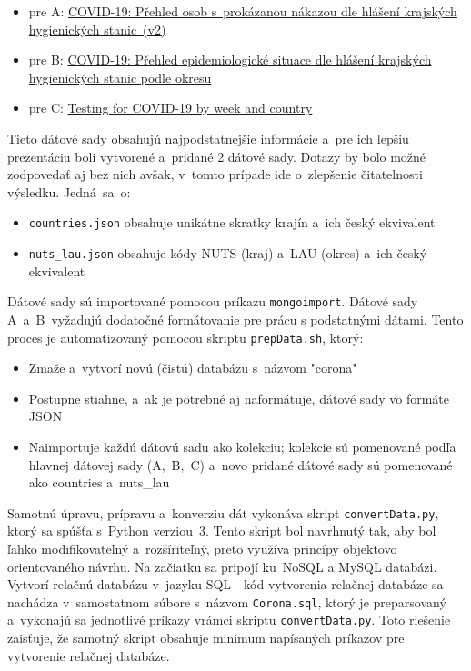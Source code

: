 \documentclass [11pt, a4paper]{article}
\begin{document}
\begin{itemize}
\item pre A: \href{https://onemocneni-aktualne.mzcr.cz/api/v2/covid-19/osoby.min.json }{COVID-19: Přehled osob s~prokázanou nákazou dle hlášení krajských hygienických stanic~(v2)}
\item pre B: \href{https://onemocneni-aktualne.mzcr.cz/api/v2/covid-19/kraj-okres-nakazeni-vyleceni-umrti.min.json}{COVID-19: Přehled epidemiologické situace dle hlášení krajských hygienických stanic podle okresu}
\item pre C: \href{https://www.ecdc.europa.eu/en/publications-data/covid-19-testing}{Testing for COVID-19 by week and country}
\end{itemize}

Tieto dátové sady obsahujú najpodstatnejšie informácie a~pre ich lepšiu prezentáciu boli vytvorené a~pridané 2 dátové sady. Dotazy by bolo možné zodpovedať aj bez nich avšak, v~tomto prípade ide o~zlepšenie čitatelnosti výsledku. Jedná~sa~o:
\begin{itemize}
\item \texttt{countries.json} obsahuje unikátne skratky krajín a~ich český ekvivalent
\item \texttt{nuts\_lau.json} obsahuje kódy NUTS (kraj) a~LAU (okres) a~ich český ekvivalent
\end{itemize} 

Dátové sady sú importované pomocou príkazu \texttt{mongoimport}. Dátové sady A~a~B~vyžadujú dodatočné formátovanie pre prácu s podstatnými dátami. Tento proces je automatizovaný pomocou skriptu \texttt{prepData.sh}, ktorý:
\begin{itemize}
\item Zmaže a~vytvorí novú (čistú) databázu s~názvom "corona"
\item Postupne stiahne, a~ak je potrebné aj naformátuje, dátové sady vo formáte JSON
\item Naimportuje každú dátovú sadu ako kolekciu; kolekcie sú pomenované podľa hlavnej dátovej sady (A,~B,~C) a~novo pridané dátové sady sú pomenované ako countries a~nuts\_lau
\end{itemize}

Samotnú úpravu, prípravu a~konverziu dát vykonáva skript \texttt{convertData.py}, ktorý sa spúšťa s~Python verziou~3. Tento skript bol navrhnutý tak, aby bol ľahko modifikovateľný a~rozšíriteľný, preto využíva princípy objektovo orientovaného návrhu. Na začiatku sa pripojí ku~NoSQL a MySQL databázi. Vytvorí relačnú databázu v~jazyku SQL - kód vytvorenia relačnej databáze sa nachádza v~samostatnom súbore s~názvom \texttt{Corona.sql}, ktorý je preparsovaný a~vykonajú sa jednotlivé príkazy vrámci skriptu \texttt{convertData.py}. Toto riešenie zaisťuje, že samotný skript obsahuje minimum  napísaných príkazov pre vytvorenie relačnej databáze.
\end{document}
